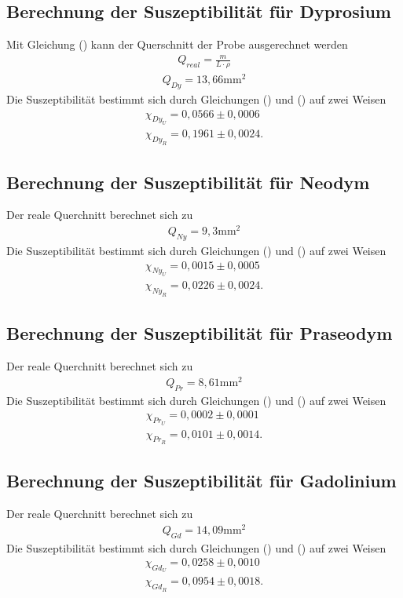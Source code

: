 \subsection{Berechnung der Suszeptibilität für Dyprosium}
Mit Gleichung () kann der Querschnitt der Probe ausgerechnet werden
\begin{align*}
Q_{real} = \frac{m}{L \cdot \rho}
\end{align*}
\begin{align*}
Q_{Dy} = 13,66 \si{\milli\meter}^2
\end{align*}
Die Suszeptibilität bestimmt sich durch Gleichungen () und () auf zwei Weisen
\begin{align*}
\chi_{Dy_U} = 0,0566 \pm 0,0006 \\
\chi_{Dy_R} = 0,1961 \pm 0,0024 .
\end{align*}

\subsection{Berechnung der Suszeptibilität für Neodym}
Der reale Querchnitt berechnet sich zu
\begin{align*}
Q_{Ny} = 9,3 \si{\milli\meter}^2
\end{align*}
Die Suszeptibilität bestimmt sich durch Gleichungen () und () auf zwei Weisen
\begin{align*}
\chi_{Ny_U} = 0,0015 \pm 0,0005 \\
\chi_{Ny_R} = 0,0226 \pm 0,0024 .
\end{align*}

\subsection{Berechnung der Suszeptibilität für Praseodym}
Der reale Querchnitt berechnet sich zu
\begin{align*}
Q_{Pr} = 8,61 \si{\milli\meter}^2
\end{align*}
Die Suszeptibilität bestimmt sich durch Gleichungen () und () auf zwei Weisen
\begin{align*}
\chi_{Pr_U} = 0,0002 \pm 0,0001 \\
\chi_{Pr_R} = 0,0101 \pm 0,0014 .
\end{align*}

\subsection{Berechnung der Suszeptibilität für Gadolinium}
Der reale Querchnitt berechnet sich zu
\begin{align*}
Q_{Gd} = 14,09 \si{\milli\meter}^2
\end{align*}
Die Suszeptibilität bestimmt sich durch Gleichungen () und () auf zwei Weisen
\begin{align*}
\chi_{Gd_U} = 0,0258 \pm 0,0010 \\
\chi_{Gd_R} = 0,0954 \pm 0,0018 .
\end{align*}


